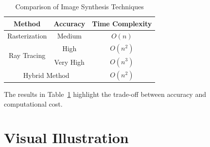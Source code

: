 \documentclass{article}
\begin{document}
\begin{table}[htbp]
    \centering
    \begin{tabular}{|c|c|c|}
        \hline
        Method & Accuracy & Time Complexity \\ \hline
        Rasterization & Medium & $O(n)$ \\ \hline
        \multirow{2}{*}{Ray Tracing} & High & $O(n^2)$ \\
         & Very High & $O(n^3)$ \\ \hline
        \multicolumn{2}{|c|}{Hybrid Method} & $O(n^2)$ \\ \hline
    \end{tabular}
    \caption{Comparison of Image Synthesis Techniques}
    \label{tab:techniques}
\end{table}

\noindent The results in Table~\ref{tab:techniques} highlight the trade-off between accuracy and computational cost.

\newpage

\section{Visual Illustration}

    
\end{document}
